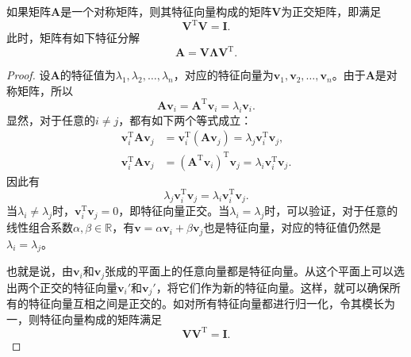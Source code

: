 \begin{theorem}[对称矩阵的特征分解]\label{thm:symmetric-eigen-decomposition}
    如果矩阵\( \mathbf{A} \)是一个对称矩阵，则其特征向量构成的矩阵\( \mathbf{V} \)为正交矩阵，即满足
    \[
        \mathbf{V}^{\mathrm{T}} \mathbf{V} = \mathbf{I}.
    \]
    此时，矩阵有如下特征分解
    \[
        \mathbf{A} = \mathbf{V} \mathbf{\Lambda} \mathbf{V}^{\mathrm{T}}.
    \]
\end{theorem}
\begin{proof}
    设\( \mathbf{A} \)的特征值为\( \lambda_1, \lambda_2, \ldots, \lambda_n \)，对应的特征向量为\( \bm{v}_1, \bm{v}_2, \ldots, \bm{v}_n \)。由于\( \mathbf{A} \)是对称矩阵，所以
    \[
        \mathbf{A} \bm{v}_i = \mathbf{A}^{\mathrm{T}} \bm{v}_i = \lambda_i \bm{v}_i.
    \]
    显然，对于任意的\( i \neq j \)，都有如下两个等式成立：
    \[
        \begin{split}
            \bm{v}_i^{\mathrm{T}} \mathbf{A} \bm{v}_j & =  \bm{v}_i^{\mathrm{T}} (\mathbf{A} \bm{v}_j)= \lambda_j \bm{v}_i^{\mathrm{T}} \bm{v}_j,                         \\
            \bm{v}_i^{\mathrm{T}} \mathbf{A} \bm{v}_j & = \left(\mathbf{A}^{\mathrm{T}} \bm{v}_i\right)^{\mathrm{T}} \bm{v}_j = \lambda_i \bm{v}_i^{\mathrm{T}} \bm{v}_j.
        \end{split}
    \]
    因此有
    \[
        \lambda_j \bm{v}_i^{\mathrm{T}} \bm{v}_j = \lambda_i \bm{v}_i^{\mathrm{T}} \bm{v}_j.
    \]
    当\( \lambda_i \neq \lambda_j \)时，\( \bm{v}_i^{\mathrm{T}} \bm{v}_j = 0 \)，即特征向量正交。当\( \lambda_i = \lambda_j \)时，可以验证，对于任意的线性组合系数\( \alpha, \beta \in \mathbb{R} \)，有\(\bm{v} = \alpha \bm{v}_i + \beta \bm{v}_j\)也是特征向量，对应的特征值仍然是\( \lambda_i = \lambda_j \)。

    也就是说，由\( \bm{v}_i \)和\( \bm{v}_j \)张成的平面上的任意向量都是特征向量。从这个平面上可以选出两个正交的特征向量\( \bm{v}_i' \)和\( \bm{v}_j' \)，将它们作为新的特征向量。这样，就可以确保所有的特征向量互相之间是正交的。如对所有特征向量都进行归一化，令其模长为一，则特征向量构成的矩阵满足
    \[
        \mathbf{V} \mathbf{V}^{\mathrm{T}} = \mathbf{I}.
    \]
\end{proof}

